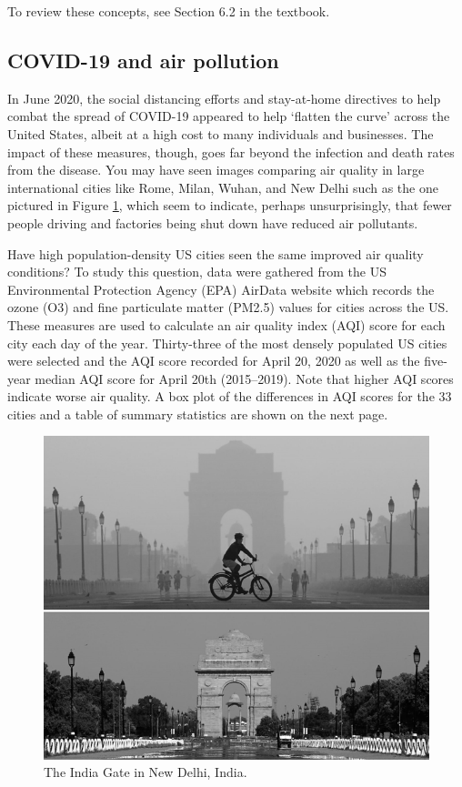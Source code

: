 \documentclass[
]{report}
\begin{document}
To review these concepts, see Section 6.2 in the textbook.

\hypertarget{covid-19-and-air-pollution}{%
\subsection{COVID-19 and air pollution}\label{covid-19-and-air-pollution}}

In June 2020, the social distancing efforts and stay-at-home directives to help combat the spread of COVID-19 appeared to help `flatten the curve' across the United States, albeit at a high cost to many individuals and businesses. The impact of these measures, though, goes far beyond the infection and death rates from the disease. You may have seen images comparing air quality in large international cities like Rome, Milan, Wuhan, and New Delhi such as the one pictured in Figure \ref{fig:covid}, which seem to indicate, perhaps unsurprisingly, that fewer people driving and factories being shut down have reduced air pollutants.

Have high population-density US cities seen the same improved air quality conditions? To study this question, data were gathered from the US Environmental Protection Agency (EPA) AirData website which records the ozone (O3) and fine particulate matter (PM2.5) values for cities across the US. These measures are used to calculate an air quality index (AQI) score for each city each day of the year. Thirty-three of the most densely populated US cities were selected and the AQI score recorded for April 20, 2020 as well as the five-year median AQI score for April 20th (2015--2019). Note that higher AQI scores indicate worse air quality. A box plot of the differences in AQI scores for the 33 cities and a table of summary statistics are shown on the next page.

\begin{figure}

{\centering \includegraphics[width=0.6\linewidth]{images/air_pollution_greyscale} 

}

\caption{The India Gate in New Delhi, India.}\label{fig:covid}
\end{figure}
\end{document}
